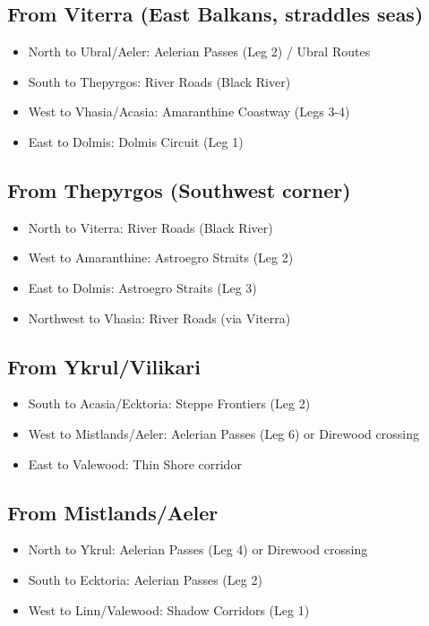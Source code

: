 \documentclass[11pt,letterpaper,twoside]{book}
\begin{document}
\subsection{From Viterra (East Balkans, straddles seas)}
\begin{itemize}
\item North to Ubral/Aeler: Aelerian Passes (Leg 2) / Ubral Routes
\item South to Thepyrgos: River Roads (Black River)
\item West to Vhasia/Acasia: Amaranthine Coastway (Legs 3-4)
\item East to Dolmis: Dolmis Circuit (Leg 1)
\end{itemize}

\subsection{From Thepyrgos (Southwest corner)}
\begin{itemize}
\item North to Viterra: River Roads (Black River)
\item West to Amaranthine: Astroegro Straits (Leg 2)
\item East to Dolmis: Astroegro Straits (Leg 3)
\item Northwest to Vhasia: River Roads (via Viterra)
\end{itemize}

\subsection{From Ykrul/Vilikari}
\begin{itemize}
\item South to Acasia/Ecktoria: Steppe Frontiers (Leg 2)
\item West to Mistlands/Aeler: Aelerian Passes (Leg 6) or Direwood crossing
\item East to Valewood: Thin Shore corridor
\end{itemize}

\subsection{From Mistlands/Aeler}
\begin{itemize}
\item North to Ykrul: Aelerian Passes (Leg 4) or Direwood crossing
\item South to Ecktoria: Aelerian Passes (Leg 2)
\item West to Linn/Valewood: Shadow Corridors (Leg 1)
\end{itemize}
\end{document}
